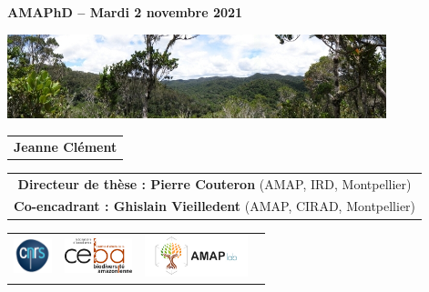 {

  \begin{frame}
      \begin{center}
          \vspace{0.1cm}
       \small{\textbf{AMAPhD -- Mardi 2 novembre 2021}}
    \end{center}
    \vspace{-0.3cm}
    \titlepage %
      \vspace{-2.8cm}
    \begin{center}
        \vspace{0.1cm}
      \includegraphics[width=11cm]{figs/Banniere.png}
    \end{center}
    \begin{center}
    \begin{tabular}{c}
      \small{\textbf{Jeanne Clément}}
    \end{tabular}
   \begin{tabular}{c}
     \small{\textbf{Directeur de thèse : Pierre Couteron} (AMAP, IRD, Montpellier)} \\
     \small{\textbf{Co-encadrant : Ghislain Vieilledent} (AMAP, CIRAD, Montpellier)} 
    \end{tabular}
      \begin{tabular}{ccc}
        \quad \quad \includegraphics[height=1cm]{figs/logo_CNRS.png} & \quad \quad
        \includegraphics[height=1cm]{figs/Logo_CEBA_Détail de l'acronyme.jpg} & \quad
        \includegraphics[height=1.2cm]{figs/AMAP.jpg} 
        ~
      \end{tabular}
      
\end{center}
\vspace{0.2cm}
\end{frame}
}
\setcounter{framenumber}{0}

